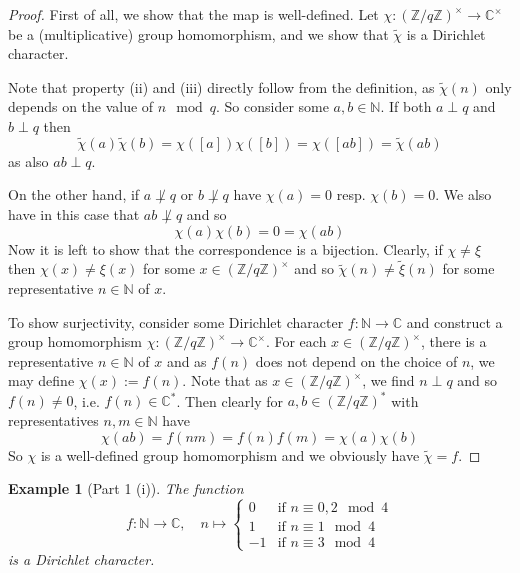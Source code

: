 \documentclass{scrartcl}
\newcommand{\N}{\mathbb{N}}
\newcommand{\Z}{\mathbb{Z}}
\newcommand{\C}{\mathbb{C}}
\newcommand{\units}{\times}
\newtheorem{example}[definition]{Example}
\begin{document}
\begin{proof}
    First of all, we show that the map is well-defined. Let $\chi: (\Z/q\Z)^\units \to \C^\units$ be a (multiplicative) group homomorphism, and we show that $\tilde{\chi}$ is a Dirichlet character.
    
    Note that property (ii) and (iii) directly follow from the definition, as $\tilde{\chi}(n)$ only depends on the value of $n \mod q$.
    So consider some $a, b \in \N$.
    If both $a \perp q$ and $b \perp q$ then
    \begin{equation*}
        \tilde{\chi}(a)\tilde{\chi}(b) = \chi([a])\chi([b]) = \chi([ab]) = \tilde{\chi}(ab)
    \end{equation*}
    as also $ab \perp q$.

    On the other hand, if $a \not\perp q$ or $b \not\perp q$ have $\chi(a) = 0$ resp. $\chi(b) = 0$.
    We also have in this case that $ab \not\perp q$ and so
    \begin{equation*}
        \chi(a)\chi(b) = 0 = \chi(ab)
    \end{equation*}
    Now it is left to show that the correspondence is a bijection.
    Clearly, if $\chi \neq \xi$ then $\chi(x) \neq \xi(x)$ for some $x \in (\Z/q\Z)^\units$ and so $\tilde{\chi}(n) \neq \tilde{\xi}(n)$ for some representative $n \in \N$ of $x$.
    
    To show surjectivity, consider some Dirichlet character $f: \N \to \C$ and construct a group homomorphism $\chi: (\Z/q\Z)^\units \to \C^\units$. 
    For each $x \in (\Z/q\Z)^\units$, there is a representative $n \in \N$ of $x$ and as $f(n)$ does not depend on the choice of $n$, we may define $\chi(x) := f(n)$.
    Note that as $x \in (\Z/q\Z)^\units$, we find $n \perp q$ and so $f(n) \neq 0$, i.e. $f(n) \in \C^*$.
    Then clearly for $a, b \in (\Z/q\Z)^*$ with representatives $n, m \in \N$ have
    \begin{equation*}
        \chi(ab) = f(nm) = f(n)f(m) = \chi(a)\chi(b)
    \end{equation*}
    So $\chi$ is a well-defined group homomorphism and we obviously have $\tilde{\chi} = f$.
\end{proof}
\begin{example}[Part 1 (i)]
    \label{ex:nontrivial_dirichlet_character_mod_4}
    The function
    \begin{equation*}
        f: \N \to \C, \quad n \mapsto \begin{cases}
            0 & \text{if $n \equiv 0, 2 \mod 4$} \\
            1 & \text{if $n \equiv 1 \mod 4$} \\
            -1 & \text{if $n \equiv 3 \mod 4$}
        \end{cases}
    \end{equation*}
    is a Dirichlet character.
\end{example}
\end{document}
